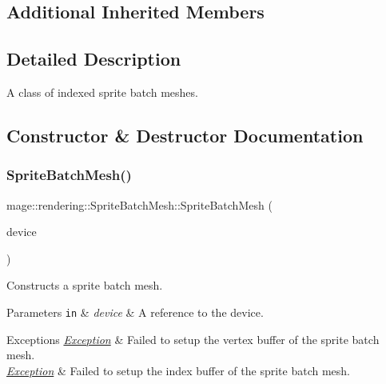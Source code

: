 \subsection*{Additional Inherited Members}


\subsection{Detailed Description}
A class of indexed sprite batch meshes. 

\subsection{Constructor \& Destructor Documentation}
\hypertarget{classmage_1_1rendering_1_1_sprite_batch_mesh_a992adb566fc9718869f0c6e6f1391df7}{}\label{classmage_1_1rendering_1_1_sprite_batch_mesh_a992adb566fc9718869f0c6e6f1391df7} 
\subsubsection{\texorpdfstring{Sprite\+Batch\+Mesh()}{SpriteBatchMesh()}\hspace{0.1cm}{\footnotesize\ttfamily [1/3]}}
{\footnotesize\ttfamily mage\+::rendering\+::\+Sprite\+Batch\+Mesh\+::\+Sprite\+Batch\+Mesh (\begin{DoxyParamCaption}\item[{I\+D3\+D11\+Device \&}]{device }\end{DoxyParamCaption})\hspace{0.3cm}{\ttfamily [explicit]}}

Constructs a sprite batch mesh.


\begin{DoxyParams}[1]{Parameters}
\mbox{\tt in}  & {\em device} & A reference to the device. \\
\hline
\end{DoxyParams}

\begin{DoxyExceptions}{Exceptions}
{\em \hyperlink{classmage_1_1_exception}{Exception}} & Failed to setup the vertex buffer of the sprite batch mesh. \\
\hline
{\em \hyperlink{classmage_1_1_exception}{Exception}} & Failed to setup the index buffer of the sprite batch mesh. \\
\hline
\end{DoxyExceptions}
\hypertarget{classmage_1_1rendering_1_1_sprite_batch_mesh_a961b1df4f0e0b8dc17f968a5e61c2ce6}{}\label{classmage_1_1rendering_1_1_sprite_batch_mesh_a961b1df4f0e0b8dc17f968a5e61c2ce6} 
